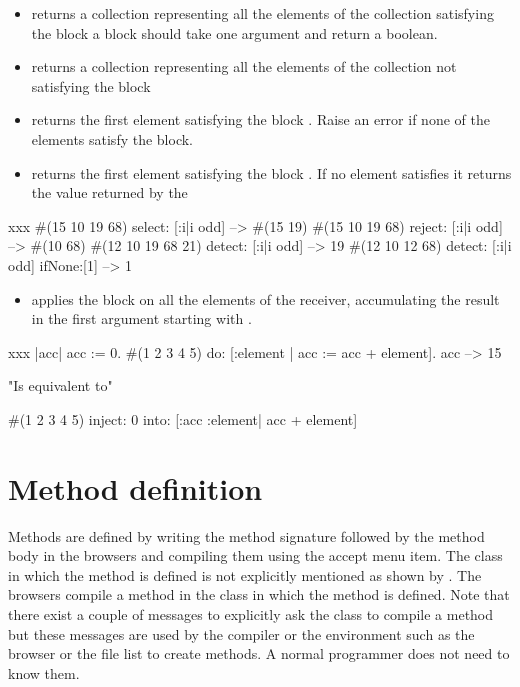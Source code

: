 \documentclass[a4paper,10pt,twoside]{book}
\begin{document}
\begin{itemize}
\item  {} returns a collection representing all the elements of the collection 
satisfying the block  a block should take one argument and return a boolean. 
\item  {} returns a collection representing all the elements of the collection 
not satisfying the block 

\item  {} returns the first element satisfying  the block . Raise an error if none of the elements satisfy the block. 
\item  {} returns the first element satisfying the block . If no element satisfies it  returns the value returned by the 
\end{itemize}

\begin{script}[xxx]{xxx}
#(15 10 19 68) select: [:i|i odd] 
--> #(15 19)
#(15 10 19 68) reject: [:i|i odd] 
--> #(10 68)		
#(12 10 19 68 21) detect: [:i|i odd]
-->  19
#(12 10 12 68) detect: [:i|i odd] ifNone:[1] 
--> 1
\end{script}


\begin{itemize}
\item {} applies the block  on all the elements of the receiver, accumulating the result in the first argument starting with .
\end{itemize}


\begin{script}[xxx]{xxx}
|acc|
acc := 0.
#(1 2 3 4 5) do: [:element | acc := acc + element].
acc 
-->  15

"Is equivalent to" 

#(1 2 3 4 5) 
   inject: 0 
   into: [:acc :element| acc + element]
\end{script}


\section{Method definition}
Methods are defined by writing the method signature followed by the method body in the browsers and compiling them using the accept menu item. The class in which the method is defined is not explicitly mentioned as shown by . 
The browsers compile a method in the class in which the method is defined. Note that there exist a couple of messages to explicitly ask the class to compile a method but these messages are used by the compiler or the environment such as the browser or the file list to create methods. A normal programmer does not need to know them. 
\end{document}
